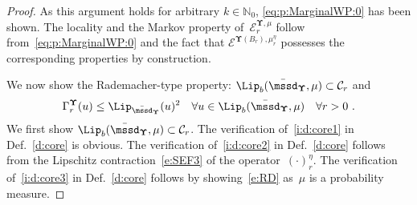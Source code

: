 \documentclass[11pt,letterpaper]{amsart}
\newcommand{\rep}[1]{\hat #1}
\renewcommand{\complement}{\mathrm{c}}
\newcommand{\set}[1]{\left\{#1\right\}}							%
\newcommand{\paren}[1]{\left(#1\right)}							%
\newcommand{\tparen}[1]{\big({#1}\big)}
\DeclareMathOperator{\car}{\mathbf 1}
\newcommand{\N}{{\mathbb N}}
\newcommand{\comma}{\,\,\mathrm{,}\;\,}
\newcommand{\fstop}{\,\,\mathrm{.}}
\newcommand{\cdc}{\Gamma}
\newcommand{\QP}{{\mu}}
\newcommand{\dUpsilon}{{\mathbf \Upsilon}}
\newcommand{\U}{\dUpsilon}
\newcommand{\E}{\mathcal E}
\renewcommand{\1}{\mathbf 1}
\numberwithin{equation}{section}
\theoremstyle{plain}
\theoremstyle{definition}
\theoremstyle{remark}
\begin{document}
\begin{proof}
As this argument holds for arbitrary $k \in \N_0$, \eqref{eq:p:MarginalWP:0} has been shown. The locality and the Markov property of~$\E_{r}^{\U, \mu}$ follow from~\eqref{eq:p:MarginalWP:0} and the fact that $\E^{\U(B_r), \mu_r^\eta}$ possesses the corresponding properties by construction. 

 We now show the Rademacher-type property: $\Lip_b(\bar{\mssd}_\U, \QP) \subset \mathcal C_r$ and
\begin{align} \label{e:RD}
\cdc^\U_r(u) \le \Lip_{\bar{\mssd}_\U}(u)^2  \quad \forall u \in \Lip_b(\bar{\mssd}_\U, \QP) \quad \forall r>0\fstop
\end{align}
We first show $\Lip_b(\bar{\mssd}_\U, \QP) \subset \mathcal C_r$. The verification of~\ref{i:d:core1} in Def.~\ref{d:core} is obvious. The verification of~\ref{i:d:core2} in Def.~\ref{d:core} follows from the Lipschitz contraction~\eqref{e:SEF3} of the operator~$(\cdot)_r^\eta$. The verification of~\ref{i:d:core3} in Def.~\ref{d:core} follows by showing~\eqref{e:RD} as~$\QP$ is a probability measure.  


\end{proof}
\end{document}
